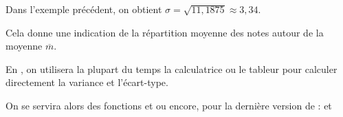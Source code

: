 \documentclass[10pt,openright,twoside,french]{book}
\begin{document}
\begin{Exemple}
    Dans l'exemple précédent, on obtient $\sigma = \sqrt{11,1875} \approx 3,34$.\par
    Cela donne une indication de la répartition moyenne des notes autour de la moyenne $\overline m$.
\end{Exemple}

\begin{Rmq}
    En \premiere\sti, on utilisera la plupart du temps la calculatrice ou le tableur pour calculer directement la variance et l'écart-type.\par
    On se servira alors des fonctions  et  ou encore, pour la dernière version de  :  et 
\end{Rmq}
\end{document}
